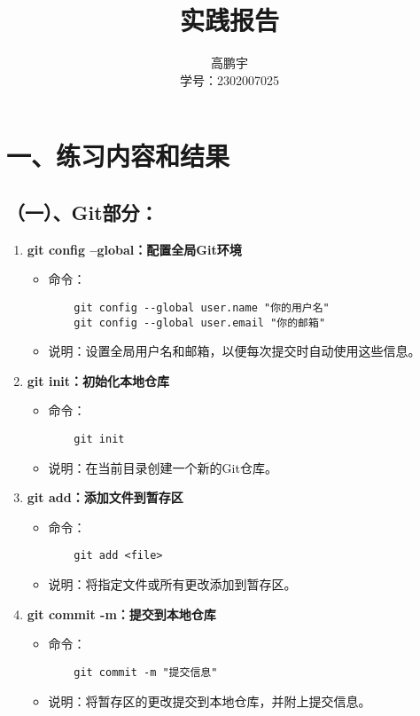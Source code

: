 \documentclass[UTF8]{ctexart}
\title{实践报告}
\author{高鹏宇\\ 学号：2302007025}
\date{}
\begin{document}
\maketitle

\section*{一、练习内容和结果}

\subsection*{（一）、Git部分：}

\begin{enumerate}
  \item \textbf{git config –global：配置全局Git环境}
  \begin{itemize}
    \item 命令：
    \begin{verbatim}
    git config --global user.name "你的用户名"
    git config --global user.email "你的邮箱"
    \end{verbatim}
    \item 说明：设置全局用户名和邮箱，以便每次提交时自动使用这些信息。
  \end{itemize}

  \item \textbf{git init：初始化本地仓库}
  \begin{itemize}
    \item 命令：
    \begin{verbatim}
    git init
    \end{verbatim}
    \item 说明：在当前目录创建一个新的Git仓库。
  \end{itemize}

  \item \textbf{git add：添加文件到暂存区}
  \begin{itemize}
    \item 命令：
    \begin{verbatim}
    git add <file>
    \end{verbatim}
    \item 说明：将指定文件或所有更改添加到暂存区。
  \end{itemize}

  \item \textbf{git commit -m：提交到本地仓库}
  \begin{itemize}
    \item 命令：
    \begin{verbatim}
    git commit -m "提交信息"
    \end{verbatim}
    \item 说明：将暂存区的更改提交到本地仓库，并附上提交信息。
  \end{itemize}


\end{enumerate}
\end{document}
